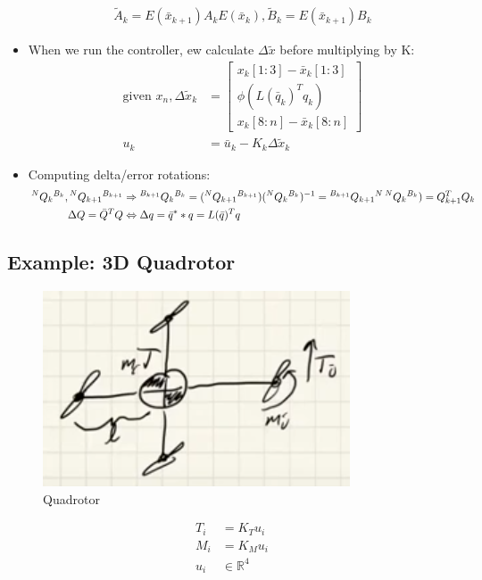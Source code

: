 \begin{itemize}
    \begin{align}
        \tilde A_k = E(\bar{x}_{k+1}) A_k E(\bar{x}_{k}), \tilde B_k = E(\bar{x}_{k+1}) B_k
    \end{align}
    \item When we run the controller, ew calculate $\Delta \tilde x$ before multiplying by K:
    \begin{align}
        \text{given } x_n, \Delta \tilde x_k & = 
        \begin{bmatrix}
            x_k[1:3] - \bar{x}_k[1:3] \\
            \phi(L(\bar{q}_k)^T q_k) \\
            x_k[8:n] - \bar{x}_k[8:n] 
        \end{bmatrix} \\
        u_k & = \bar{u}_k - K_k \Delta \tilde x_k
    \end{align}
    \item Computing delta/error rotations:
    \begin{align}
        \prescript{N}{}{Q_k}^{B_k}, \prescript{N}{}{Q_{k+1}}^{B_{k+1}} & \Rightarrow
        \prescript{B_{k+1}}{}{Q_k}^{B_k} = (\prescript{N}{}{Q_{k+1}}^{B_{k+1}}) (\prescript{N}{}{Q_k}^{B_k})^{-1} = \prescript{B_{k+1}}{}{Q_{k+1}}^N \prescript{N}{}{Q_k}^{B_k}) = Q_{k+1}^T Q_k \\
        \Delta Q = \bar{Q}^T Q & \Leftrightarrow \Delta q = \bar{q}^* * q = L(\bar{q})^T q
    \end{align}
\end{itemize}

\subsection{Example: 3D Quadrotor}

\begin{figure}
    \centering
    \includegraphics[width=0.4\linewidth]{L12_Images/F1.PNG}
    \caption{Quadrotor}
    \label{fig:l12f1}
\end{figure}

\begin{align}
    T_i &= K_T u_i \\
    M_i &= K_M u_i \\
    u_i &\in \mathbb{R}^4
\end{align}

